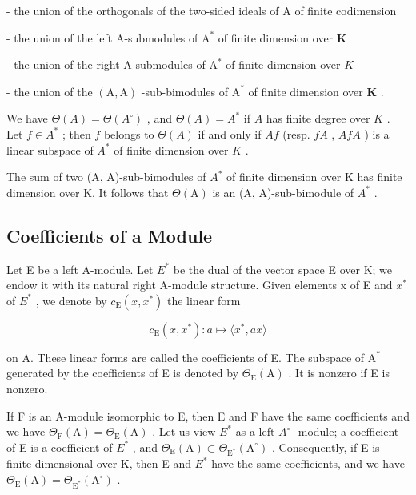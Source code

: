 - the union of the orthogonals of the two-sided ideals of \(\mathrm{A}\) of finite codimension

- the union of the left A-submodules of \(\mathrm{A}^*\) of finite dimension over \(\mathbf{K}\)

- the union of the right A-submodules of \(\mathrm{A}^*\) of finite dimension over \(K\)

- the union of the \((\mathrm{A},\mathrm{A})\) -sub-bimodules of \(\mathrm{A}^*\) of finite dimension over \(\mathbf{K}\) .

We have \(\Theta(A) = \Theta(A^{\circ})\) , and \(\Theta(A) = A^{*}\) if \(A\) has finite degree over \(K\) . Let \(f \in A^{*}\) ; then \(f\) belongs to \(\Theta(A)\) if and only if \(Af\) (resp. \(fA\) , \(AfA\) ) is a linear subspace of \(A^{*}\) of finite dimension over \(K\) .

The sum of two (A, A)-sub-bimodules of \(A^{*}\) of finite dimension over K has finite dimension over K. It follows that \(\Theta(\mathrm{A})\) is an (A, A)-sub-bimodule of \(A^{*}\) .

\subsection{Coefficients of a Module}

Let E be a left A-module. Let \(E^{*}\) be the dual of the vector space E over K; we endow it with its natural right A-module structure. Given elements x of E and \(x^{*}\) of \(E^{*}\) , we denote by \(c_{\mathrm{E}}(x, x^{*})\) the linear form

\[
c _ {\mathrm{E}} (x, x ^ {*}): a \mapsto \langle x ^ {*}, a x \rangle\tag{5}
\]

on A. These linear forms are called the coefficients of E. The subspace of \(\mathrm{A}^*\) generated by the coefficients of E is denoted by \(\Theta_{\mathrm{E}}(\mathrm{A})\) . It is nonzero if E is nonzero.

If F is an A-module isomorphic to E, then E and F have the same coefficients and we have \(\Theta_{\mathrm{F}}(\mathrm{A}) = \Theta_{\mathrm{E}}(\mathrm{A})\) . Let us view \(E^{*}\) as a left \(A^{\circ}\) -module; a coefficient of E is a coefficient of \(E^{*}\) , and \(\Theta_{\mathrm{E}}(\mathrm{A}) \subset \Theta_{\mathrm{E}^{*}}(\mathrm{A}^{\circ})\) . Consequently, if E is finite-dimensional over K, then E and \(E^{*}\) have the same coefficients, and we have \(\Theta_{\mathrm{E}}(\mathrm{A}) = \Theta_{\mathrm{E}^{*}}(\mathrm{A}^{\circ})\) .

